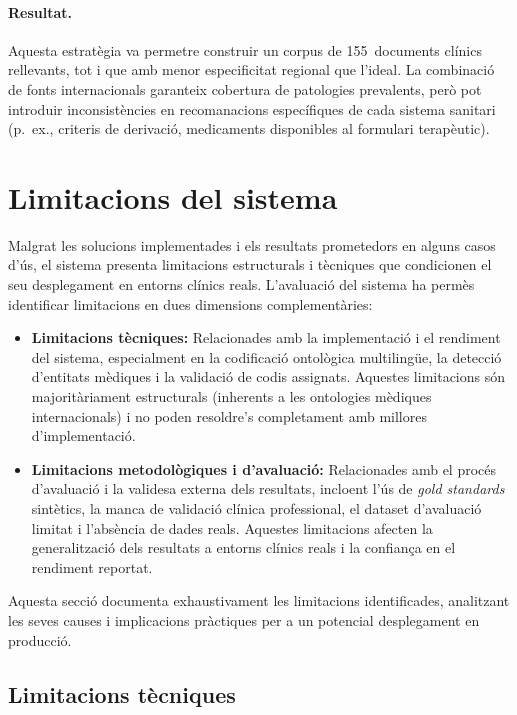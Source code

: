 \documentclass[CAT]{TFUOC}%
\begin{document}
\paragraph{Resultat.}
Aquesta estratègia va permetre construir un corpus de 155~documents clínics rellevants, tot i que amb menor especificitat regional que l'ideal. La combinació de fonts internacionals garanteix cobertura de patologies prevalents, però pot introduir inconsistències en recomanacions específiques de cada sistema sanitari (p.~ex., criteris de derivació, medicaments disponibles al formulari terapèutic).

\section{Limitacions del sistema}

Malgrat les solucions implementades i els resultats prometedors en alguns casos d'ús, el sistema presenta limitacions estructurals i tècniques que condicionen el seu desplegament en entorns clínics reals. L'avaluació del sistema ha permès identificar limitacions en dues dimensions complementàries:

\begin{itemize}
    \item \textbf{Limitacions tècniques:} Relacionades amb la implementació i el rendiment del sistema, especialment en la codificació ontològica multilingüe, la detecció d'entitats mèdiques i la validació de codis assignats. Aquestes limitacions són majoritàriament estructurals (inherents a les ontologies mèdiques internacionals) i no poden resoldre's completament amb millores d'implementació.
    
    \item \textbf{Limitacions metodològiques i d'avaluació:} Relacionades amb el procés d'avaluació i la validesa externa dels resultats, incloent l'ús de \textit{gold standards} sintètics, la manca de validació clínica professional, el dataset d'avaluació limitat i l'absència de dades reals. Aquestes limitacions afecten la generalització dels resultats a entorns clínics reals i la confiança en el rendiment reportat.
\end{itemize}

Aquesta secció documenta exhaustivament les limitacions identificades, analitzant les seves causes i implicacions pràctiques per a un potencial desplegament en producció.

\subsection{Limitacions tècniques}
\end{document}
